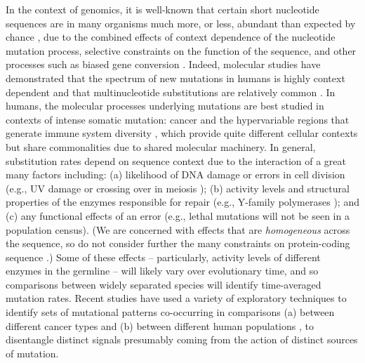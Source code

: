 \documentclass{article}
\theoremstyle{plain}
\theoremstyle{definition}
\begin{document}
In the context of genomics,
it is well-known that certain short nucleotide sequences
are in many organisms much more, or less, abundant than expected by chance \citep{burge1992underrepresentation},
due to the combined effects of context dependence of the nucleotide mutation process,
selective constraints on the function of the sequence,
and other processes such as biased gene conversion \citep{duret2009biased,arbeithuber2015crossovers}.
Indeed, molecular studies have demonstrated that the spectrum of new mutations in humans
is highly context dependent \citep{schaibley2013influence}
and that multinucleotide substitutions are relatively common \citep{schrider2011pervasive,terekhanova2013prevalence,harris2013errorprone}.
In humans, the molecular processes underlying mutations are best studied in contexts of intense somatic mutation:
cancer and the hypervariable regions that generate immune system diversity \citep{cobey2015evolution},
which provide quite different cellular contexts but share commonalities due to shared molecular machinery.
In general, substitution rates depend on sequence context due to the interaction of a great many factors including:
(a) likelihood of DNA damage or errors in cell division (e.g., UV damage \citep{goodman2002errorprone} or crossing over in meiosis \citep{arbeithuber2015crossovers});
(b) activity levels and structural properties of the enzymes responsible for repair
(e.g., Y-family polymerases \citep{goodman2013translesion,sale2012yfamily});
and (c) any functional effects of an error (e.g., lethal mutations will not be seen in a population census).
(We are concerned with effects that are \emph{homogeneous} across the sequence,
so do not consider further the many constraints on protein-coding sequence \citep[reviewed in][]{thorne2007protein}.)
Some of these effects -- particularly, activity levels of different enzymes in the germline --
will likely vary over evolutionary time,
and so comparisons between widely separated species will identify time-averaged mutation rates.
Recent studies have used a variety of exploratory techniques to identify sets of mutational patterns
co-occurring in comparisons (a) between different cancer types \citep{alexandrov2013signatures,shiraishi2015simple} and
(b) between different human populations \citep{harris2015evidence,harris2016rapid,mathieson2017differences},
to disentangle distinct signals presumably coming from the action of distinct sources of mutation.
\end{document}
